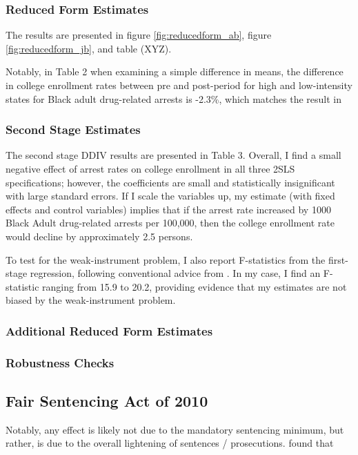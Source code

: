 \documentclass{article}
\begin{document}
\subsubsection{Reduced Form Estimates}

The results are presented in figure \ref{fig:reducedform_ab}, figure \ref{fig:reducedform_jb}, and table (XYZ). 

Notably, in Table 2 when examining a simple difference in means, the difference in college enrollment rates between pre and post-period for high and low-intensity states for Black adult drug-related arrests is -2.3\%, which matches the result in \cite{britton2022}

\subsubsection{Second Stage Estimates}

The second stage DDIV results are presented in Table 3. Overall, I find a small negative effect of arrest rates on college enrollment in all three 2SLS specifications; however, the coefficients are small and statistically insignificant with large standard errors. If I scale the variables up, my estimate (with fixed effects and control variables) implies that if the arrest rate increased by 1000 Black Adult drug-related arrests per 100,000, then the college enrollment rate would decline by approximately 2.5 persons.

To test for the weak-instrument problem, I also report F-statistics from the first-stage regression, following conventional advice from \cite{staiger1997precise}. In my case, I find an F-statistic ranging from 15.9 to 20.2, providing evidence that my estimates are not biased by the weak-instrument problem.

\subsubsection{Additional Reduced Form Estimates}

\subsubsection{Robustness Checks}

\subsection{Fair Sentencing Act of 2010}

Notably, any effect is likely not due to the mandatory sentencing minimum, but rather, is due to the overall lightening of sentences / prosecutions. \cite{ussc} found that
\end{document}
